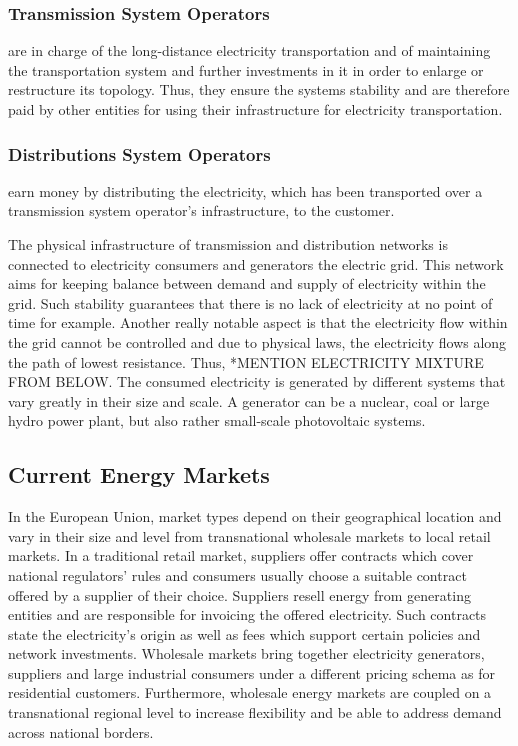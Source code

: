 \documentclass[runningheads]{llncs}
\begin{document}
\subsubsection{Transmission System Operators} are in charge of the long-distance electricity transportation and of maintaining the transportation system and further investments in it in order to enlarge or restructure its topology. Thus, they ensure the systems stability and are therefore paid by other entities for using their infrastructure for electricity transportation.

\subsubsection{Distributions System Operators} earn money by distributing the electricity, which has been transported over a transmission system operator’s infrastructure, to the customer. \newline

The physical infrastructure of transmission and distribution networks is connected to electricity consumers and generators the electric grid. This network aims for keeping balance between demand and supply of electricity within the grid. Such stability guarantees that there is no lack of electricity at no point of time for example. Another really notable aspect is that the electricity flow within the grid cannot be controlled and due to physical laws, the electricity flows along the path of lowest resistance. Thus, *MENTION ELECTRICITY MIXTURE FROM BELOW.
The consumed electricity is generated by different systems that vary greatly in their size and scale. A generator can be a nuclear, coal or large hydro power plant, but also rather small-scale photovoltaic systems. 


\subsection{Current Energy Markets}
In the European Union, market types depend on their geographical location and vary in their size and level from transnational wholesale markets to local retail markets. In a traditional retail market, suppliers offer contracts which cover national regulators’ rules and consumers usually choose a suitable contract offered by a supplier of their choice. Suppliers resell energy from generating entities and are responsible for invoicing the offered electricity. Such contracts state the electricity’s origin as well as fees which support certain policies and network investments.
Wholesale markets bring together electricity generators, suppliers and large industrial consumers under a different pricing schema as for residential customers. Furthermore, wholesale energy markets are coupled on a transnational regional level to increase flexibility and be able to address demand across national borders.\cite{eu_energy_market}
\end{document}
